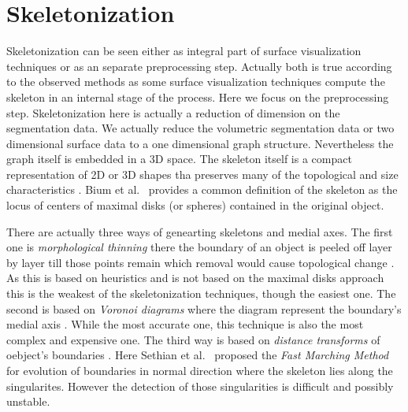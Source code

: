 \section{Skeletonization}

Skeletonization can be seen either as integral part of surface visualization techniques or as an separate preprocessing step. Actually both is true according to the observed methods as some surface visualization techniques compute the skeleton in an internal stage of the process. Here we focus on the preprocessing step.
Skeletonization here is actually a reduction of dimension on the segmentation data. We actually reduce the volumetric segmentation data or two dimensional surface data to a one dimensional graph structure. Nevertheless the graph itself is embedded in a 3D space.
The skeleton itself is a compact representation of 2D or 3D shapes tha preserves many of the topological and size characteristics \cite{ebert2002augmented}. Bium et al.~\cite{bium1964transformation} provides a common definition of the skeleton as the locus of centers of maximal disks (or spheres) contained in the original object.

There are actually three ways of genearting skeletons and medial axes. The first one is \emph{morphological thinning} there the boundary of an object is peeled off layer by layer till those points remain which removal would cause topological change \cite{ebert2002augmented}. As this is based on heuristics and is not based on the maximal disks approach this is the weakest of the skeletonization techniques, though the easiest one. The second is based on \emph{Voronoi diagrams} where the diagram represent the boundary's medial axis \cite{ebert2002augmented}. While the most accurate one, this technique is also the most complex and expensive one. The third way is based on \emph{distance transforms} of oebject's boundaries \cite{ebert2002augmented}. Here Sethian et al.~\cite{sethian1996fast} proposed the \emph{Fast Marching Method} for evolution of boundaries in normal direction where the skeleton lies along the singularites. However the detection of those singularities is difficult and possibly unstable.  

